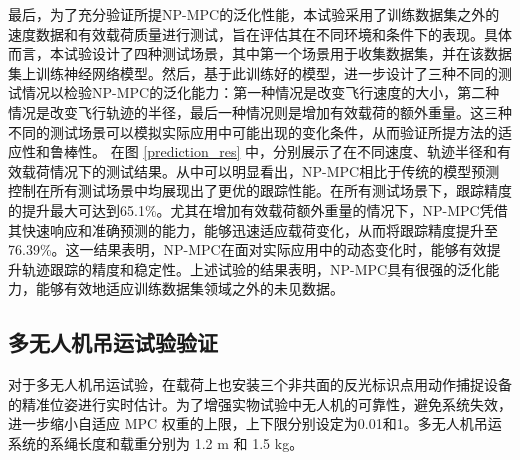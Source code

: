\documentclass[lang=chs, degree=master, blindreview=true, winfonts=true]{yanputhesis}
\begin{document}
最后，为了充分验证所提NP-MPC的泛化性能，本试验采用了训练数据集之外的速度数据和有效载荷质量进行测试，旨在评估其在不同环境和条件下的表现。具体而言，本试验设计了四种测试场景，其中第一个场景用于收集数据集，并在该数据集上训练神经网络模型。然后，基于此训练好的模型，进一步设计了三种不同的测试情况以检验NP-MPC的泛化能力：第一种情况是改变飞行速度的大小，第二种情况是改变飞行轨迹的半径，最后一种情况则是增加有效载荷的额外重量。这三种不同的测试场景可以模拟实际应用中可能出现的变化条件，从而验证所提方法的适应性和鲁棒性。
在图 \ref{prediction_res} 中，分别展示了在不同速度、轨迹半径和有效载荷情况下的测试结果。从中可以明显看出，NP-MPC相比于传统的模型预测控制在所有测试场景中均展现出了更优的跟踪性能。在所有测试场景下，跟踪精度的提升最大可达到65.1\%。尤其在增加有效载荷额外重量的情况下，NP-MPC凭借其快速响应和准确预测的能力，能够迅速适应载荷变化，从而将跟踪精度提升至76.39\%。这一结果表明，NP-MPC在面对实际应用中的动态变化时，能够有效提升轨迹跟踪的精度和稳定性。上述试验的结果表明，NP-MPC具有很强的泛化能力，能够有效地适应训练数据集领域之外的未见数据。

\subsection{多无人机吊运试验验证}
对于多无人机吊运试验，在载荷上也安装三个非共面的反光标识点用动作捕捉设备的精准位姿进行实时估计。为了增强实物试验中无人机的可靠性，避免系统失效，进一步缩小自适应 MPC 权重的上限，上下限分别设定为0.01和1。多无人机吊运系统的系绳长度和载重分别为 1.2 m 和 1.5 kg。
\end{document}
